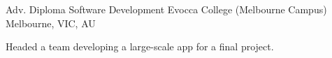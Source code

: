 

\begin{cventries}

  \cventry
    {Adv. Diploma Software Development} %
    {Evocca College (Melbourne Campus)} %
    {}
    {Melbourne, VIC, AU} %
    {
      \begin{cvitems}
        \item {Headed a team developing a large-scale app for a final project.}
      \end{cvitems}
    }
\end{cventries}